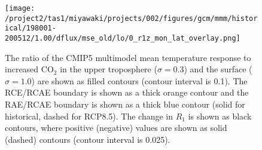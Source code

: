 \documentclass{ametsocV5}
\begin{document}
\begin{figure}
  \centering
  \noindent\texttt{[image: /project2/tas1/miyawaki/projects/002/figures/gcm/mmm/historical/198001-200512/1.00/dflux/mse\_old/lo/0\_r1z\_mon\_lat\_overlay.png]}\\
  \caption{The ratio of the CMIP5 multimodel mean temperature response to increased CO$_2$ in the upper troposphere ($\sigma=0.3$) and the surface ($\sigma=1.0$) are shown as filled contours (contour interval is 0.1). The RCE/RCAE boundary is shown as a thick orange contour and the RAE/RCAE boundary is shown as a thick blue contour (solid for historical, dashed for RCP8.5). The change in $R_1$ is shown as black contours, where positive (negative) values are shown as solid (dashed) contours (contour interval is 0.025).}
  \label{fig:cmip5-dtemp}
\end{figure}

\end{document}
